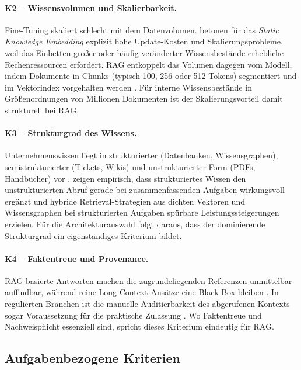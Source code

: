 \paragraph{K2 -- Wissensvolumen und Skalierbarkeit.}\label{krit:k2}
Fine-Tuning skaliert schlecht mit dem Datenvolumen.
\textcite[4]{Song.2025} betonen für das \textit{Static Knowledge Embedding} explizit hohe Update-Kosten und Skalierungsprobleme, weil das Einbetten großer oder häufig veränderter Wissensbestände erhebliche Rechenressourcen erfordert.
RAG entkoppelt das Volumen dagegen vom Modell, indem Dokumente in Chunks (typisch 100, 256 oder 512 Tokens) segmentiert und im Vektorindex vorgehalten werden \autocite[8]{Gao.2024}.
Für interne Wissensbestände in Größenordnungen von Millionen Dokumenten ist der Skalierungsvorteil damit strukturell bei RAG.

\paragraph{K3 -- Strukturgrad des Wissens.}\label{krit:k3}
Unternehmenswissen liegt in strukturierter (Datenbanken, Wissensgraphen), semistrukturierter (Tickets, Wikis) und unstrukturierter Form (PDFs, Handbücher) vor \autocite[1]{Karakurt.2026}. \textcite[17]{Karakurt.2026} zeigen empirisch, dass strukturiertes Wissen den unstrukturierten Abruf gerade bei zusammenfassenden Aufgaben wirkungsvoll ergänzt und hybride Retrieval-Strategien aus dichten Vektoren und Wissensgraphen bei strukturierten Aufgaben spürbare Leistungssteigerungen erzielen. Für die Architekturauswahl folgt daraus, dass der dominierende Strukturgrad ein eigenständiges Kriterium bildet.

\paragraph{K4 -- Faktentreue und Provenance.}\label{krit:k4}
RAG-basierte Antworten machen die zugrundeliegenden Referenzen unmittelbar auffindbar, während reine Long-Context-Ansätze eine Black Box bleiben \autocite[14]{Gao.2024}.
In regulierten Branchen ist die manuelle Auditierbarkeit des abgerufenen Kontexts sogar Voraussetzung für die praktische Zulassung \autocite[20]{Karakurt.2026}. Wo Faktentreue und Nachweispflicht essenziell sind, spricht dieses Kriterium eindeutig für RAG.

\subsection{Aufgabenbezogene Kriterien}
\label{sec:krit-aufgabe}

